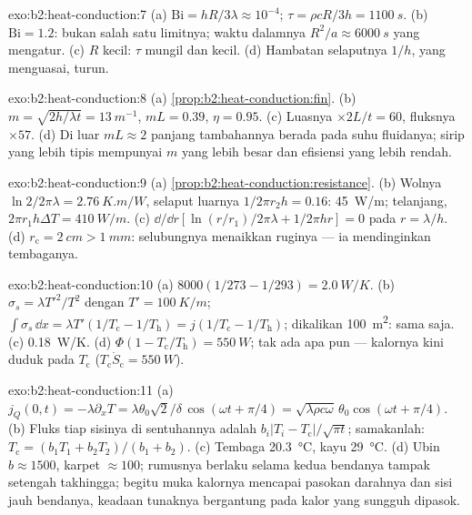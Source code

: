 \begin{solution}{exo:b2:heat-conduction:7}
(a) $\mathrm{Bi} = hR/3\lambda \approx 10^{-4}$; $\tau = \rho cR/3h = \qty{1100}{s}$.
(b) $\mathrm{Bi} = 1.2$: bukan salah satu limitnya; waktu dalamnya $R^2/a \approx
\qty{6000}{s}$ yang mengatur. (c) $R$ kecil: $\tau$ mungil dan  kecil.
(d) Hambatan selaputnya $1/h$, yang menguasai, turun.
\end{solution}

\begin{solution}{exo:b2:heat-conduction:8}
(a) \cref{prop:b2:heat-conduction:fin}. (b) $m = \sqrt{2h/\lambda t} =
\qty{13}{m^{-1}}$, $mL = 0.39$, $\eta = 0.95$. (c) Luasnya $\times 2L/t = 60$, fluksnya
$\times 57$. (d) Di luar $mL \approx 2$ panjang tambahannya berada pada suhu
fluidanya; sirip yang lebih tipis mempunyai $m$ yang lebih besar dan efisiensi yang lebih rendah.
\end{solution}

\begin{solution}{exo:b2:heat-conduction:9}
(a) \cref{prop:b2:heat-conduction:resistance}. (b) Wolnya $\ln 2/2\pi\lambda =
\qty{2.76}{K.m/W}$, selaput luarnya $1/2\pi r_2h = 0.16$: \qty{45}{W/m}; telanjang,
$2\pi r_1h\Delta T = \qty{410}{W/m}$. (c) $\dd/\dd r[\ln(r/r_1)/2\pi\lambda + 1/2\pi hr]
= 0$ pada $r = \lambda/h$. (d) $r_{\text{c}} = \qty{2}{cm} > \qty{1}{mm}$: selubungnya
menaikkan ruginya --- ia mendinginkan tembaganya.
\end{solution}

\begin{solution}{exo:b2:heat-conduction:10}
(a) $8000(1/273 - 1/293) = \qty{2.0}{W/K}$. (b) $\sigma_s = \lambda T'^2/T^2$ dengan
$T' = \qty{100}{K/m}$; $\int\sigma_s\,\dd x = \lambda T'(1/T_{\text{c}} - 1/T_{\text{h}})
= j(1/T_{\text{c}} - 1/T_{\text{h}})$; dikalikan \qty{100}{m^2}: sama saja. (c)
\qty{0.18}{W/K}. (d) $\Phi(1 - T_{\text{c}}/T_{\text{h}}) = \qty{550}{W}$; tak ada apa pun
--- kalornya kini duduk pada $T_{\text{c}}$ ($T_{\text{c}}\dot S_{\text{c}} = \qty{550}{W}$).
\end{solution}

\begin{solution}{exo:b2:heat-conduction:11}
(a) $j_Q(0,t) = -\lambda\partial_xT = \lambda\theta_0\sqrt2/\delta\,\cos(\omega t +
\pi/4) = \sqrt{\lambda\rho c\omega}\,\theta_0\cos(\omega t + \pi/4)$. (b) Fluks tiap
sisinya di sentuhannya adalah $b_i|T_i - T_{\text{c}}|/\sqrt{\pi t}$; samakanlah:
$T_{\text{c}} = (b_1T_1 + b_2T_2)/(b_1 + b_2)$. (c) Tembaga \qty{20.3}{\celsius},
kayu \qty{29}{\celsius}. (d) Ubin $b \approx 1500$, karpet $\approx 100$;
rumusnya berlaku selama kedua bendanya tampak setengah takhingga; begitu muka
kalornya mencapai pasokan darahnya dan sisi jauh bendanya, keadaan
tunaknya bergantung pada kalor yang sungguh dipasok.
\end{solution}

